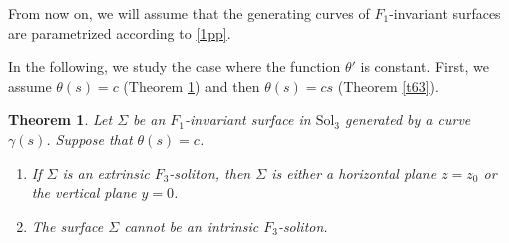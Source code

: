 \documentclass[a4paper,12pt]{amsart}
\theoremstyle{plain}
\newtheorem{theorem}{Theorem}[section]
\theoremstyle{definition}
\def\sol{\text{Sol}_3}
\begin{document}
From now on, we will assume that the generating curves of $F_1$-invariant surfaces are parametrized according to \eqref{1pp}. 

In the following, we study the case where the function $\theta'$ is constant. First, we assume $\theta(s)=c$ (Theorem \ref{t62}) and then $\theta(s)=cs$ (Theorem \ref{t63}).

\begin{theorem}\label{t62}
Let $\Sigma$ be an $F_1$-invariant surface in $\sol$ generated by a curve $\gamma(s)$. Suppose that $\theta(s)=c$.
\begin{enumerate}
 \item If $\Sigma$ is an extrinsic $F_3$-soliton, then $\Sigma$ is either a horizontal plane $z = z_0$ or the vertical plane $y = 0$.
 \item The surface $\Sigma$ cannot be an intrinsic $F_3$-soliton.
\end{enumerate}
\end{theorem}
\end{document}

